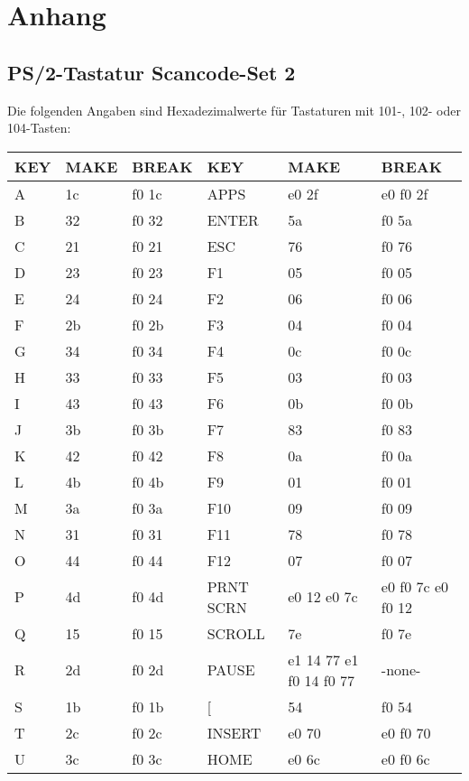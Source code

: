 \chapter{Anhang}
\section{PS/2-Tastatur Scancode-Set 2}
Die folgenden Angaben sind Hexadezimalwerte für Tastaturen mit 101-, 102- oder 104-Tasten:
\begin{longtable}{| p{} | p{} | p{} || p{} | p{} | p{} |}
  \hline
  \textbf{KEY} & \textbf{MAKE} & \textbf{BREAK} & \textbf{KEY} & \textbf{MAKE} & \textbf{BREAK} \\ \hline
  A & 1c & f0 1c & APPS & e0 2f & e0 f0 2f \\ \hline
  B & 32 & f0 32 & ENTER & 5a & f0 5a \\ \hline
  C & 21 & f0 21 & ESC & 76 & f0 76 \\ \hline
  D & 23 & f0 23 & F1 & 05 & f0 05 \\ \hline
  E & 24 & f0 24 & F2 & 06 & f0 06 \\ \hline
  F & 2b & f0 2b & F3 & 04 & f0 04 \\ \hline
  G & 34 & f0 34 & F4 & 0c & f0 0c \\ \hline
  H & 33 & f0 33 & F5 & 03 & f0 03 \\ \hline
  I & 43 & f0 43 & F6 & 0b & f0 0b \\ \hline
  J & 3b & f0 3b & F7 & 83 & f0 83 \\ \hline
  K & 42 & f0 42 & F8 & 0a & f0 0a \\ \hline
  L & 4b & f0 4b & F9 & 01 & f0 01 \\ \hline
  M & 3a & f0 3a & F10 & 09 & f0 09 \\ \hline
  N & 31 & f0 31 & F11 & 78 & f0 78 \\ \hline
  O & 44 & f0 44 & F12 & 07 & f0 07 \\ \hline
  P & 4d & f0 4d & PRNT SCRN & e0 12 e0 7c & e0 f0 7c e0 f0 12 \\ \hline
  Q & 15 & f0 15 & SCROLL & 7e & f0 7e \\ \hline
  R & 2d & f0 2d & PAUSE & e1 14 77 e1 f0 14 f0 77 & -none- \\ \hline
  S & 1b & f0 1b & [ & 54 & f0 54 \\ \hline
  T & 2c & f0 2c & INSERT & e0 70 & e0 f0 70 \\ \hline
  U & 3c & f0 3c & HOME & e0 6c & e0 f0 6c \\ \hline

\end{longtable}
